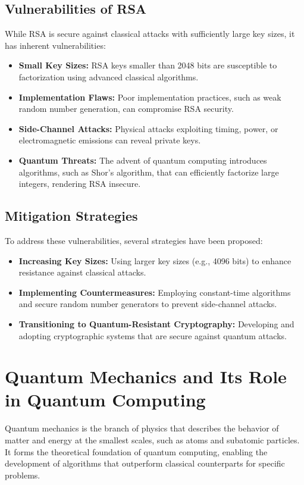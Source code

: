 \documentclass[12pt,a4paper]{report}
\begin{document}
\section{Vulnerabilities of RSA}
While RSA is secure against classical attacks with sufficiently large key sizes, it has inherent vulnerabilities:
\begin{itemize}
    \item \textbf{Small Key Sizes:} RSA keys smaller than 2048 bits are susceptible to factorization using advanced classical algorithms.
    \item \textbf{Implementation Flaws:} Poor implementation practices, such as weak random number generation, can compromise RSA security.
    \item \textbf{Side-Channel Attacks:} Physical attacks exploiting timing, power, or electromagnetic emissions can reveal private keys.
    \item \textbf{Quantum Threats:} The advent of quantum computing introduces algorithms, such as Shor's algorithm, that can efficiently factorize large integers, rendering RSA insecure.
\end{itemize}

\section{Mitigation Strategies}
To address these vulnerabilities, several strategies have been proposed:
\begin{itemize}
    \item \textbf{Increasing Key Sizes:} Using larger key sizes (e.g., 4096 bits) to enhance resistance against classical attacks.
    \item \textbf{Implementing Countermeasures:} Employing constant-time algorithms and secure random number generators to prevent side-channel attacks.
    \item \textbf{Transitioning to Quantum-Resistant Cryptography:} Developing and adopting cryptographic systems that are secure against quantum attacks.
\end{itemize}

\chapter{Quantum Mechanics and Its Role in Quantum Computing}
\label{chap:quantum_mechanics}
Quantum mechanics is the branch of physics that describes the behavior of matter and energy at the smallest scales, such as atoms and subatomic particles. It forms the theoretical foundation of quantum computing, enabling the development of algorithms that outperform classical counterparts for specific problems.
\end{document}

